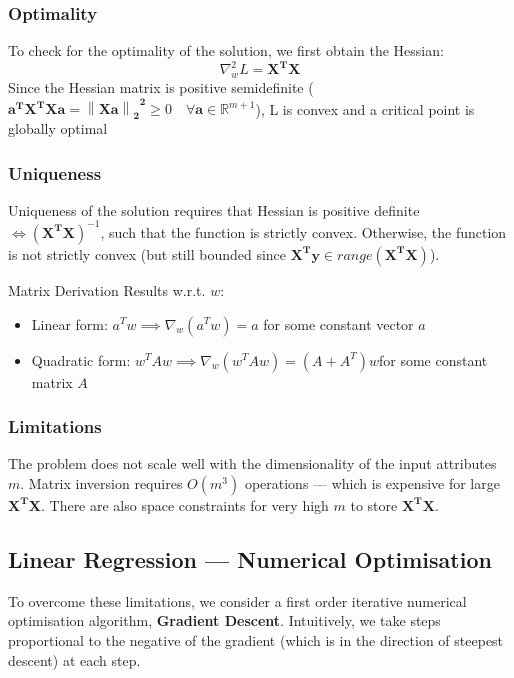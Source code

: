 \subsubsection{Optimality}
To check for the optimality of the solution, we first obtain the Hessian:
\[\nabla_w^{2}L=\mathbf{X^{T}X}\]
Since the Hessian matrix is positive semidefinite
($\mathbf{a^{T}X^{T}Xa={\left\lVert Xa \right\rVert_2}^{2}}\ge 0\quad \forall
\mathbf{a}\in \mathbb{R}^{m+1}$), L is convex and a critical point is globally
optimal
\subsubsection{Uniqueness}
Uniqueness of the solution requires that Hessian is positive definite
$\iff\mathbf{(X^{T}X)}^{-1}$, such that the function is strictly convex.
Otherwise, the function is not strictly convex (but still bounded since
$\mathbf{X^{T}y}\in range(\mathbf{X^{T}X})$).
\begin{remark}
  Matrix Derivation Results w.r.t. $w$:
  \begin{itemize}
    \item Linear form: \(a^T w\implies\nabla_w (a^T w) = a\) for some constant vector \(a\)
    \item Quadratic form: \(w^T A w \implies\nabla_w (w^T A w) = (A + A^T) w\)for some constant matrix \(A\)
  \end{itemize}
\end{remark}
\subsubsection{Limitations}
The problem does not scale well with the dimensionality of the input attributes
$m$. Matrix inversion requires $O(m^{3})$ operations --- which is expensive for
large $\mathbf{X^{T}X}$. There are also space constraints for very high $m$ to
store $\mathbf{X^{T}X}$.

\subsection{Linear Regression --- Numerical Optimisation}
To overcome these limitations, we consider a first order iterative numerical
optimisation algorithm, \textbf{Gradient Descent}. Intuitively, we take steps proportional
to the negative of the gradient (which is in the direction of steepest descent)
at each step.
